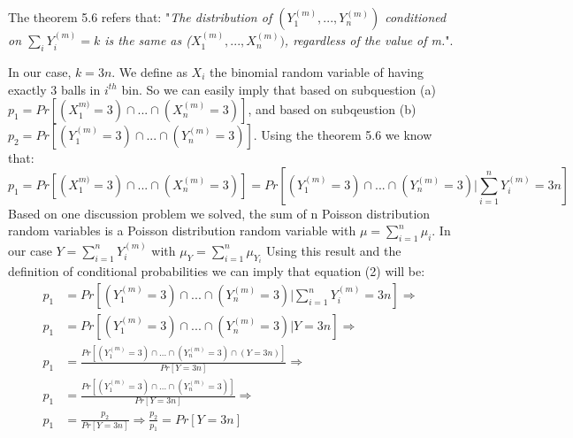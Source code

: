 \documentclass[11pt]{537homework}
\begin{document}
\subsection{}
The theorem 5.6 refers that: "\textit{The distribution of $(Y_1^{(m)},...,Y_n^{(m)})$ conditioned on $\sum_{i}^{} Y_i^{(m)} = k$ is the same as ($X_1^(m),...,X_n^{(m)})$, regardless of the value of m.}". 
\par In our case, $k = 3n$. We define as $X_i$ the binomial random variable of having exactly 3 balls in $i^{th}$ bin. So we can easily imply that based on subquestion (a) $p_1 = Pr[(X_1^{m)} = 3) \cap ... \cap (X_n^{(m)} = 3)]$, and based on subqeustion (b) $p_2 = Pr[(Y_1^{(m)} = 3) \cap ... \cap (Y_n^{(m)} = 3)]$. Using the theorem 5.6 we know that:
\begin{equation}
p_1 = Pr[(X_1^{m)} = 3) \cap ... \cap (X_n^{(m)} = 3)] =  Pr[(Y_1^{(m)} = 3) \cap ... \cap (Y_n^{(m)} = 3) |  \sum_{i= 1}^{n} Y_i^{(m)} = 3n]
\end{equation}
Based on one discussion problem we solved, the sum of n Poisson distribution random variables is a Poisson distribution random variable with $\mu = \sum_{i= 1}^{n} \mu_i$. In our case $Y = \sum_{i= 1}^{n} Y_i^{(m)}$ with $\mu_Y = \sum_{i= 1}^{n} \mu_{Y_i}$ Using this result and the definition of conditional probabilities we can imply that equation (2) will be:
\begin{align*}
p_1 &=  Pr[(Y_1^{(m)} = 3) \cap ... \cap (Y_n^{(m)} = 3) |  \sum_{i= 1}^{n} Y_i^{(m)} = 3n] \Longrightarrow \\
p_1 &=  Pr[(Y_1^{(m)} = 3) \cap ... \cap (Y_n^{(m)} = 3) |  Y = 3n] \Longrightarrow \\
p_1 &=  \displaystyle{\frac{Pr[(Y_1^{(m)} = 3) \cap ... \cap (Y_n^{(m)} = 3) \cap (Y = 3n)]}{Pr[Y = 3n]}} \Longrightarrow \\
p_1 &=  \displaystyle{\frac{Pr[(Y_1^{(m)} = 3) \cap ... \cap (Y_n^{(m)} = 3)]}{Pr[Y = 3n]}} \Longrightarrow \\
p_1 &=  \displaystyle{\frac{p_2}{Pr[Y = 3n]}} \Longrightarrow \displaystyle{\frac{p_2}{p_1}} =  Pr[Y = 3n]
\end{align*}
\end{document}
